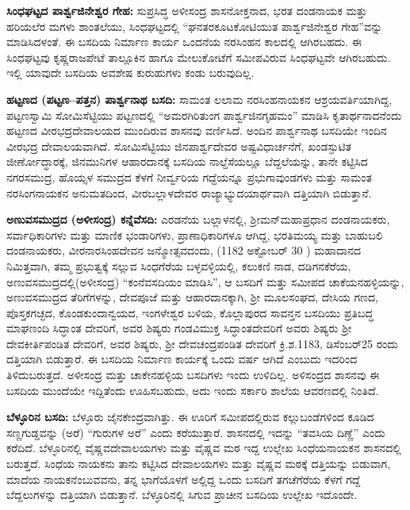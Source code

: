 \textbf{ಸಿಂಧಘಟ್ಟದ ಪಾರ್ಶ್ವಜಿನೇಶ್ವರ ಗೇಹ:} ಸುಪ್ರಸಿದ್ಧ ಅಳೀಸಂದ್ರ ಶಾಸನೋಕ್ತನಾದ, ಭರತ ದಂಡನಾಯಕ ಮತ್ತು ಹರಿಯಲೆರ ಮಗಳು ಶಾಂತಲೆಯು, ಸಿಂಧಘಟ್ಟದಲ್ಲಿ “ಘನತರಕೂಟಕೋಟಿಯುತ ಪಾರ್ಶ್ವಜಿನೇಶ್ವರ ಗೇಹ”ವನ್ನು ಮಾಡಿಸಿದಳಂತೆ. ಈ ಬಸದಿಯ ನಿರ್ಮಾಣ ಕಾರ್ಯ ಒಂದನೆಯ ನರಸಿಂಹನ ಕಾಲದಲ್ಲಿ ಆಗಿರಬಹದು. ಈ ಸಿಂಧಘಟ್ಟವು ಕೃಷ್ಣರಾಜಪೇಟೆ ತಾಲ್ಲೂಕಿನ ಹಾಗೂ ಮೇಲುಕೋಟೆಗೆ ಸಮೀಪವಿರುವ ಸಿಂಧಘಟ್ಟವೇ ಆಗಿರಬಹುದು. ಇಲ್ಲಿ ಯಾವುದೇ ಬಸದಿಯ ಅವಶೇಷ ಕುರುಹುಗಳು ಕಂಡು ಬರುವುದಿಲ್ಲ.

\textbf{ಹಟ್ಟಣದ (ಪಟ್ಟಣ–ಪತ್ತನ) ಪಾರ್ಶ್ವನಾಥ ಬಸದಿ:} ಸಾಮಂತ ಲಲಾಮ ನರಸಿಂಹನಾಯಕನ ಆಶ್ರಯವರ್ತಿಯಾಗಿದ್ದ, ಪಟ್ಟಣಸ್ವಾಮಿ ಸೋಮಿಸೆಟ್ಟಿಯು ಪಟ್ಟಣದಲ್ಲಿ “ಅಮರಗಿರಿತುಂಗ ಪಾರ್ಶ್ವಜಿನಗೃಹಮಂ” ಮಾಡಿಸಿ ಕೃತಾರ್ಥನಾದನೆಂದು ಹಟ್ಟಣದ ವೀರಭದ್ರದೇವಾಲಯದ ಮುಂದಿರುವ ಶಾಸನವು ವರ್ಣಿಸಿದೆ. ಅಂದಿನ ಪಾರ್ಶ್ವನಾಥ ಬಸದಿಯೇ ಇಂದಿನ ವೀರಭದ್ರ ದೇವಾಲಯವಾಗಿದೆ. ಸೋಮಿಸೆಟ್ಟಿಯು ಜಿನಪಾರ್ಶ್ವದೇವರ ಅಷ್ಟವಿಧಾರ್ಚನೆಗೆ, ಖಂಡಸ್ಫುಟಿತ ಜೀರ್ಣೋದ್ಧಾರಕ್ಕೆ, ಜಿನಮುನಿಗಳ ಆಹಾರದಾನಕ್ಕೆ ಬಸದಿಯ ನಾಲ್ದೆಸೆಯಲ್ಲೂ ಬೆದ್ದಲೆಯನ್ನು, ತಾನೇ ಕಟ್ಟಿಸಿದ ನಗರಸಮುದ್ರ, ಹೊಯ್ಸಳ ಸಮುದ್ರದ ಕೆಳಗೆ ನೀರ್ವ್ವರಿಯ ಗದ್ದೆಯನ್ನೂ ಪ್ರಭುಗಾವುಂಡಗಳು ಮತ್ತು ಸಾಮಂತ ನರಸಿಂಗನಾಯಕನ ಅನುಮತದಿಂದ, ವೀರಬಲ್ಲಾಳದೇವರ ರಾಜ್ಯಾಭ್ಯುದಯಾರ್ಥವಾಗಿ ದತ್ತಿಯಾಗಿ ಬಿಡುತ್ತಾನೆ.

\textbf{ಅಣುವಸಮುದ್ರದ (ಅಳೀಸಂದ್ರ) ಕನ್ನೆವೆಸದಿ:} ಎರಡನೆಯ ಬಲ್ಲಾಳನಲ್ಲಿ, ಶ‍್ರೀಮನ್​ ಮಹಾಪ್ರಧಾನ ದಂಡನಾಯಕರು, ಸರ್ವಾಧಿಕಾರಿಗಳು ಮತ್ತು ಮಾಣಿಕ ಭಂಡಾರಿಗಳು, ಪ್ರಾಣಾಧಿಕಾರಿಗಳೂ ಆಗಿದ್ದ, ಭರತಿಮಯ್ಯ ಮತ್ತು ಬಾಹುಬಲಿ ದಂಡನಾಯಕರು, ವೀರನಾರಸಿಂಹದೇವನ ಜನ್ಮೋತ್ಸವದಂದು, (1182 ಅಕ್ಟೋಬರ್​ 30 ) ಮಹಾದಾನದ ನಿಮಿತ್ತವಾಗಿ, ತಮ್ಮ ಪ್ರಭುತ್ವಕ್ಕೆ ಸಲ್ಲುವ ಸಿಂಧಗೆರೆಯ ಬಳ್ಳವಳ್ಳಿಯಲ್ಲಿ, ಕಲುಕಣಿ ನಾಡ, ದಡಿಗನಕೆರೆಯ, ಅಣುವಸಮುದ್ರದಲ್ಲಿ(ಅಳೀಸಂದ್ರ) “ಕಂನೆವಸದಿಯಂ ಮಾಡಿಸಿ”, ಆ ಬಸದಿಗೆ ಮತ್ತು ಸಮೀಪದ ಚಾಕೆಯನಹಳ್ಳಿಯನ್ನು, ಅಣುವಸಮುದ್ರದ ತೆರಿಗೆಗಳನ್ನು, ದೇವಪೂಜೆ ಮತ್ತು ಆಹಾರದಾನಕ್ಕಾಗಿ, ಶ‍್ರೀ ಮೂಲಸಂಘದ, ದೇಸಿಯ ಗಣದ, ಪೊಸ್ತಕಗಚ್ಛದ, ಕೊಂಡಕುಂದಾನ್ವಯದ, ಇಂಗಳೇಶ್ವರ ಬಳಿಯ, ಕೊಲ್ಲಾಪುರದ ಸಾವನ್ತನ ಬಸದಿಯು ಪ್ರತಿಬದ್ಧ ಮಾಘಣಂದಿ ಸಿದ್ಧಾಂತ ದೇವರಿಗೆ, ಅವರ ಶಿಷ್ಯರು ಗಂಡವಿಮುಕ್ತ ಸಿದ್ಧಾಂತದೇವರಿಗೆ ಅವರು ಶಿಷ್ಯರು ಶ‍್ರೀ ದೇವಕೀರ್ತಿಪಂಡಿತ ದೇವರಿಗೆ, ಅವರ ಶಿಷ್ಯರು, ಶ‍್ರೀ ದೇವಚಂದ್ರಪಂಡಿತ ದೇವರಿಗೆ ಕ್ರಿ.ಶ.1183, ಡಿಸೆಂಬರ್​ 25 ರಂದು ದತ್ತಿಯಾಗಿ ಬಿಡುತ್ತಾರೆ. ಈ ಬಸದಿಯ ನಿರ್ಮಾಣ ಕಾರ್ಯಕ್ಕೆ ಒಂದು ವರ್ಷ ಆಗಿದೆ ಎಂಬುದು ಇದರಿಂದ ತಿಳಿದುಬರುತ್ತದೆ. ಅಳೀಸಂದ್ರ ಮತ್ತು ಚಾಕೇನಹಳ್ಳಿಯ ಬಸದಿಗಳು ಇಂದು ಉಳಿದಿಲ್ಲ. ಅಳಿಸಂದ್ರದ ಶಾಸನವು ಈ ಬಸದಿಯ ಮುಂದೆಯೇ ಇದ್ದಿತೆಂದು ಊಹಿಸಬಹುದು, ಅದು ಇಂದು ಸರ್ಕಾರಿ ಶಾಲೆಯ ಆವರಣದಲ್ಲಿ ನಿಂತಿದೆ. 

\textbf{ಬೆಳ್ಳೂರಿನ ಬಸದಿ:} ಬೆಳ್ಳೂರು ಜೈನಕೇಂದ್ರವಾಗಿತ್ತು. ಈ ಊರಿಗೆ ಸಮೀಪದಲ್ಲಿರುವ ಕಲ್ಲುಬಂಡೆಗಳಿಂದ ಕೂಡಿದ ಸಣ್ಣಗುಡ್ಡವನ್ನು (ಅರೆ) “ಗುರುಗಳ ಅರೆ” ಎಂದು ಕರೆಯುತ್ತಾರೆ. ಶಾಸನದಲ್ಲಿ ಇದನ್ನು “ತವಸಿಯ ದಿಣ್ಣೆ” ಎಂದು ಕರೆದಿದೆ. ಬೆಳ್ಳೂರಿನಲ್ಲಿ ವೈಷ್ಣವದೇವಾಲಯಗಳು ಮತ್ತು ವೈಷ್ಣವ ಮಠ ಇದ್ದ ಉಲ್ಲೇಖ ಸಿಂಧೆಯನಾಯಕನ ಶಾಸನದಲ್ಲಿ ಬರುತ್ತದೆ. ಸಿಂಧೆಯ ನಾಯಕನು ತಾನು ಕಟ್ಟಿಸಿದ ದೇವಾಲಯಗಳು ಮತ್ತು ವೈಷ್ಣವ ಮಠಕ್ಕೆ ದತ್ತಿಯನ್ನು ಬಿಡುವಾಗ, ಮಾದೆಯ ನಾಯಕನೆಂಬುವವನು, ತನ್ನ ಭಾಗೆಯೊಳಗೆ ಅಲ್ಲಿದ್ದ ಒಂದು ಬಸದಿಗೆ ತಗಚೆಗೆರೆಯ ಕೆಳಗೆ ಗದ್ದೆ ಬೆದ್ದಲುಗಳನ್ನು ದತ್ತಿಯಾಗಿ ಬಿಡುತ್ತಾನೆ. ಬೆಳ್ಳೂರಿನಲ್ಲಿ ಸಿಗುವ ಪ್ರಾಚೀನ ಬಸದಿಯ ಉಲ್ಲೇಖ ಇದೊಂದೇ.

